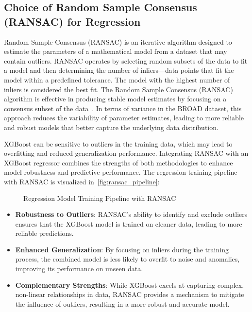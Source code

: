 \documentclass{iutbscthesis}
\begin{document}
\subsection{Choice of Random Sample Consensus (RANSAC) for Regression}

Random Sample Consensus (RANSAC) is an iterative algorithm designed to estimate the parameters of a mathematical model from a dataset that may contain outliers. RANSAC operates by selecting random subsets of the data to fit a model and then determining the number of inliers—data points that fit the model within a predefined tolerance. The model with the highest number of inliers is considered the best fit. The Random Sample Consensus (RANSAC) algorithm is effective in producing stable model estimates by focusing on a consensus subset of the data~\cite{fischler1981random}. In terms of variance in the BROAD dataset, this approach reduces the variability of parameter estimates, leading to more reliable and robust models that better capture the underlying data distribution.


 XGBoost can be sensitive to outliers in the training data, which may lead to overfitting and reduced generalization performance. Integrating RANSAC with an XGBoost regressor combines the strengths of both methodologies to enhance model robustness and predictive performance. The regression training pipeline with RANSAC is visualized in~\autoref{fig:ransac_pipeline}:

\begin{figure}
    \centering
    
    \caption{Regression Model Training Pipeline with RANSAC}
    \label{fig:ransac_pipeline}
\end{figure}

\begin{itemize}
    \item \textbf{Robustness to Outliers}: RANSAC's ability to identify and exclude outliers ensures that the XGBoost model is trained on cleaner data, leading to more reliable predictions.

    \item \textbf{Enhanced Generalization}: By focusing on inliers during the training process, the combined model is less likely to overfit to noise and anomalies, improving its performance on unseen data.

    \item \textbf{Complementary Strengths}: While XGBoost excels at capturing complex, non-linear relationships in data, RANSAC provides a mechanism to mitigate the influence of outliers, resulting in a more robust and accurate model.
\end{itemize}
\end{document}
